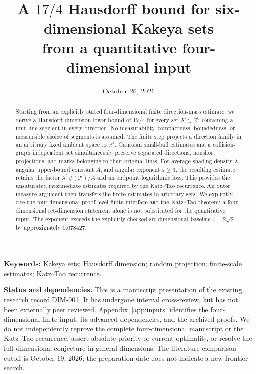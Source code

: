 \documentclass[a4paper,11pt]{article}
\title{A $17/4$ Hausdorff bound for six-dimensional Kakeya sets\\from a quantitative four-dimensional input}
\author{}\date{October 26, 2026}
\numberwithin{equation}{section}
\theoremstyle{plain}
\theoremstyle{definition}
\theoremstyle{remark}\newtheorem{remark}[theorem]{Remark}
\newcommand{\R}{\mathbb R}\newcommand{\T}{\mathcal T}\newcommand{\Kest}{\mathsf K}
\newcommand{\card}[1]{\#\!\left(#1\right)}
\begin{document}
\maketitle
\begin{abstract}
Starting from an explicitly stated four-dimensional finite direction-mass estimate, we derive a Hausdorff dimension lower bound of $17/4$ for every set $K\subset\R^6$ containing a unit line segment in every direction. No measurability, compactness, boundedness, or measurable choice of segments is assumed. The finite step projects a direction family in an arbitrary fixed ambient space to $\R^4$. Gaussian small-ball estimates and a collision-graph independent set simultaneously preserve separated directions, nonshort projections, and marks belonging to their original lines. For average shading density $\lambda$, angular upper-bound constant $A$, and angular exponent $s\ge3$, the resulting estimate retains the factor $\lambda^2\card{\T}/A$ and an endpoint logarithmic loss. This provides the unsaturated intermediate estimates required by the Katz--Tao recurrence. An outer-measure argument then transfers the finite estimates to arbitrary sets. We explicitly cite the four-dimensional proof-level finite interface and the Katz--Tao theorem; a four-dimensional set-dimension statement alone is not substituted for the quantitative input. The exponent exceeds the explicitly checked six-dimensional baseline $7-2\sqrt2$ by approximately $0.078427$.
\end{abstract}
\noindent\textbf{Keywords:} Kakeya sets; Hausdorff dimension; random projection; finite-scale estimates; Katz--Tao recurrence.

\medskip
\noindent\textbf{Status and dependencies.}
This is a manuscript presentation of the existing research record DIM-001. It has undergone internal cross-review, but has not been externally peer reviewed. Appendix~\ref{app:inputs} identifies the four-dimensional finite input, its advanced dependencies, and the archived proofs. We do not independently reprove the complete four-dimensional manuscript or the Katz--Tao recurrence, assert absolute priority or current optimality, or resolve the full-dimensional conjecture in general dimensions. The literature-comparison cutoff is October 19, 2026; the preparation date does not indicate a new frontier search.







\appendix

\end{document}
